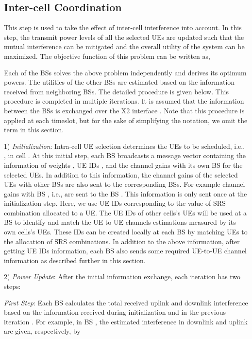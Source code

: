 \documentclass[journal]{IEEEtran}
\begin{document}
\subsection{Inter-cell Coordination}\label{sec:DSS2}
This step is used to take the effect of inter-cell interference into account. In this step, the transmit power levels of all the selected UEs are updated such that the mutual interference can be mitigated and the overall utility of the system can be maximized. The objective function of this problem can be written as,


Each of the BSs solves the above problem independently and derives its optimum powers. The utilities of the other BSs are estimated based on the information received from neighboring BSs. 
The detailed procedure is given below. This procedure is completed in multiple iterations. It is assumed that the information between the BSs is exchanged over the X2 interface \cite{3GPP:4}. Note that this procedure is applied at each timeslot, but for the sake of simplifying the notation, we omit the term  in this section. 

1) \textit{Initialization}:  Intra-cell UE selection determines the UEs to be scheduled, i.e., ,  in cell . At this initial step, each BS  broadcasts a message vector containing the information of weights , UE IDs , and the channel gains  with its own BS for the selected UEs. In addition to this information, the channel gains of the selected UEs with other BSs are also sent to the corresponding BSs. For example channel gains with BS , i.e.,  are sent to the BS . This information is only sent once at the initialization step. Here, we use UE IDs corresponding to the value of SRS combination allocated to a UE. The UE IDs of other cells's UEs will be used at a BS to identify and match the UE-to-UE channels estimations measured by its own cells's UEs. These IDs can be created locally at each BS by matching UEs to the allocation of SRS combinations. In addition to the above information, after getting UE IDs information, each BS also sends some required UE-to-UE channel information as described further in this section. 
  
2) \textit{Power Update}:  After the initial information exchange, each iteration  has two steps: 
	
\textit{First Step}: Each BS calculates the total received uplink and downlink interference based on the information received during initialization and in the previous iteration . For example, in BS , the estimated interference in downlink and uplink are given, respectively, by 
  
\end{document}
